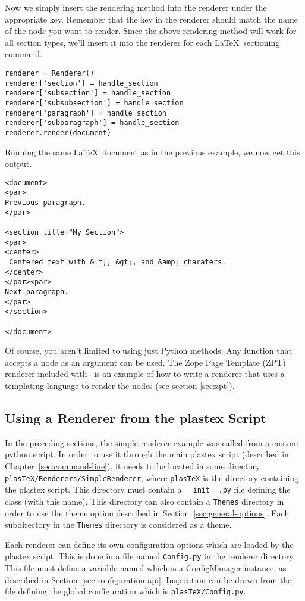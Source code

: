 Now we simply insert the rendering method into the renderer under the
appropriate key.  Remember that the key in the renderer should match
the name of the node you want to render.  Since the above rendering 
method will work for all section types, we'll insert it into the 
renderer for each \LaTeX\ sectioning command.
\begin{verbatim}
renderer = Renderer()
renderer['section'] = handle_section
renderer['subsection'] = handle_section
renderer['subsubsection'] = handle_section
renderer['paragraph'] = handle_section
renderer['subparagraph'] = handle_section
renderer.render(document)
\end{verbatim}

Running the same \LaTeX\ document as in the previous example, we now get
this output.
\begin{verbatim}
<document>
<par>
Previous paragraph.
</par>

<section title="My Section">
<par>
<center>
 Centered text with &lt;, &gt;, and &amp; charaters.
</center>
</par><par>
Next paragraph.
</par>
</section>

</document>
\end{verbatim}

Of course, you aren't limited to using just Python methods.  Any function
that accepts a node as an argument can be used.  The 
Zope Page Template (ZPT) renderer included with \plasTeX\ is an example 
of how to write a renderer that uses a templating language to render
the nodes (see section \ref{sec:zpt}).

\subsection{Using a Renderer from the plastex Script}

In the preceding sections, the simple renderer example was called from
a custom python script. In order to use it through the
main plastex script (described in Chapter~\ref{sec:command-line}), it
needs to be located in some directory
\verb+plasTeX/Renderers/SimpleRenderer+, where \verb+plasTeX+ is the
directory containing the plastex script. This directory must contain a
\verb+__init__.py+ file defining the  class (with this
name). This directory can also contain a \verb+Themes+ directory in
order to use the theme option described in
Section~\ref{sec:general-options}. Each subdirectory in the
\verb+Themes+ directory is considered as a theme.

Each renderer can define its own configuration options which are loaded
by the plastex script. This is done in a file named \verb+Config.py+
in the renderer directory. This file must define a variable named
 which is a ConfigManager instance, as described in
Section~\ref{sec:configuration-api}. Inspiration can be drawn from the
file defining the global configuration which is
\verb+plasTeX/Config.py+.

